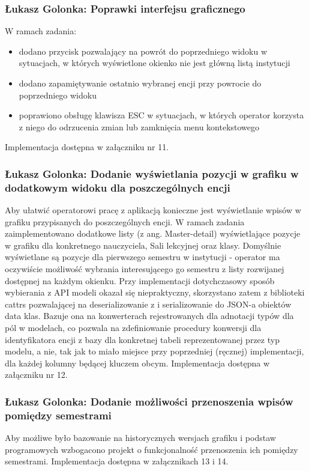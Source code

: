\documentclass[12pt,a4paper,oneside]{article}
\theoremstyle{definition}
\numberwithin{equation}{section}
\begin{document}
\subsubsection{Łukasz Golonka: Poprawki interfejsu graficznego}
W ramach zadania:
\begin{itemize}
\item dodano przycisk pozwalający na powrót do poprzedniego widoku w sytuacjach, w których wyświetlone okienko nie jest główną listą instytucji
\item dodano zapamiętywanie ostatnio wybranej encji przy powrocie do poprzedniego widoku
\item poprawiono obsługę klawisza ESC w sytuacjach, w których operator korzysta z niego do odrzucenia zmian lub zamknięcia menu kontekstowego
\end{itemize}
Implementacja dostępna w załączniku nr 11.

\subsubsection{Łukasz Golonka: Dodanie wyświetlania pozycji w grafiku w dodatkowym widoku dla poszczególnych encji}
Aby ułatwić operatorowi pracę z aplikacją konieczne jest wyświetlanie wpisów w grafiku przypisanych do poszczególnych encji.
W ramach zadania zaimplementowano dodatkowe listy (z ang. Master-detail) wyświetlające pozycje w grafiku dla konkretnego nauczyciela, Sali lekcyjnej oraz klasy.
Domyślnie wyświetlane są pozycje dla pierwszego semestru w instytucji - operator ma oczywiście możliwość wybrania interesującego go semestru z listy  rozwijanej dostępnej na każdym okienku.
Przy implementacji dotychczasowy sposób wybierania z API modeli okazał się niepraktyczny, skorzystano zatem z biblioteki cattrs \cite{cattrs} pozwalającej na deserializowanie z i serializowanie do JSON-a obiektów data klas.
Bazuje ona na konwerterach rejestrowanych dla adnotacji typów dla pól w modelach, co pozwala na zdefiniowanie procedury konwersji dla identyfikatora encji z bazy dla konkretnej tabeli reprezentowanej przez typ modelu, a nie, tak jak to miało miejsce przy poprzedniej (ręcznej) implementacji, dla każdej kolumny będącej kluczem obcym.
Implementacja dostępna w załączniku nr 12.

\subsubsection{Łukasz Golonka: Dodanie możliwości przenoszenia wpisów pomiędzy semestrami}
Aby możliwe było bazowanie na historycznych wersjach grafiku i podstaw programowych wzbogacono projekt o funkcjonalność przenoszenia ich pomiędzy semestrami.
Implementacja dostępna w załącznikach 13 i 14.
\end{document}
